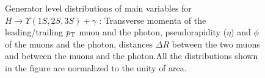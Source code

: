 \begin{figure}[!htbp]
\begin{center}
\end{center}%
\caption{Generator level distributions of main variables for $H\rightarrow  \Upsilon(1S,2S,3S) + \gamma$ : Transverse momenta of the leading/trailing $p_{\mathrm{T}}$ muon and the photon, pseudorapidity ($\eta$) and $\phi$ of the muons and the photon, distances $\Delta R$ between the two muons and between the muons and the photon.All the distributions shown in the figure are normalized to the unity of area.}
\label{fig:MC_HtoUpsilon_Cat0}
\end{figure}

